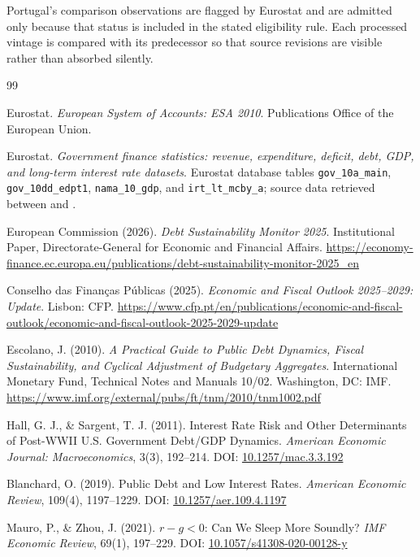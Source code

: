 \documentclass[11pt,a4paper]{article}
\providecommand{\doi}[1]{DOI: \href{https://doi.org/#1}{#1}}
\begin{document}
Portugal's \LatestYear{} comparison observations are flagged
\PortugalComparisonStatus{} by Eurostat and are admitted only because that
status is included in the stated eligibility rule. Each processed vintage is
compared with its predecessor so that source revisions are visible rather than
absorbed silently.

\newpage
\begin{thebibliography}{99}

Eurostat. \emph{European System of Accounts: ESA 2010}. Publications Office of
the European Union.

Eurostat. \emph{Government finance statistics: revenue, expenditure, deficit,
debt, GDP, and long-term interest rate datasets}. Eurostat database tables
\texttt{gov\_10a\_main}, \texttt{gov\_10dd\_edpt1}, \texttt{nama\_10\_gdp},
and \texttt{irt\_lt\_mcby\_a}; source data retrieved between
\EarliestRetrievalTimestamp{} and \LatestRetrievalTimestamp{}.

European Commission (2026). \emph{Debt Sustainability Monitor 2025}.
Institutional Paper, Directorate-General for Economic and Financial Affairs.
\url{https://economy-finance.ec.europa.eu/publications/debt-sustainability-monitor-2025_en}

Conselho das Finanças Públicas (2025). \emph{Economic and Fiscal Outlook
2025--2029: Update}. Lisbon: CFP.
\url{https://www.cfp.pt/en/publications/economic-and-fiscal-outlook/economic-and-fiscal-outlook-2025-2029-update}

Escolano, J. (2010). \emph{A Practical Guide to Public Debt Dynamics, Fiscal
Sustainability, and Cyclical Adjustment of Budgetary Aggregates}. International
Monetary Fund, Technical Notes and Manuals 10/02. Washington, DC: IMF.
\url{https://www.imf.org/external/pubs/ft/tnm/2010/tnm1002.pdf}

Hall, G. J., \& Sargent, T. J. (2011). Interest Rate Risk and Other Determinants
of Post-WWII U.S. Government Debt/GDP Dynamics. \emph{American Economic Journal:
Macroeconomics}, 3(3), 192--214. \doi{10.1257/mac.3.3.192}

Blanchard, O. (2019). Public Debt and Low Interest Rates. \emph{American
Economic Review}, 109(4), 1197--1229. \doi{10.1257/aer.109.4.1197}

Mauro, P., \& Zhou, J. (2021). $r-g<0$: Can We Sleep More Soundly?
\emph{IMF Economic Review}, 69(1), 197--229.
\doi{10.1057/s41308-020-00128-y}


\end{thebibliography}
\end{document}
